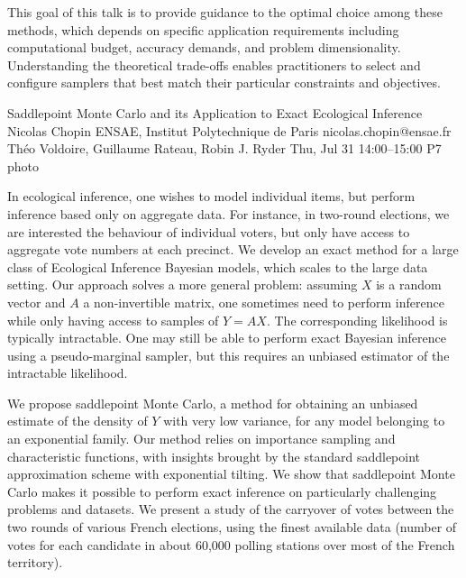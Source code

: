 \begin{talk}
This goal of this talk is to provide
guidance to 
the optimal choice among these methods, which depends on specific application requirements including computational budget, accuracy demands, and problem dimensionality. Understanding the theoretical trade-offs enables practitioners to select and configure samplers that best match their particular constraints and objectives.

\vspace{-10ex}
\end{talk}

\clearpage
\begin{talk}
  {Saddlepoint Monte Carlo and its Application to Exact Ecological Inference}%
  {Nicolas Chopin}%
  {ENSAE, Institut Polytechnique de Paris}%
  {nicolas.chopin@ensae.fr}%
  {Théo Voldoire, Guillaume Rateau, Robin J. Ryder}%
  {}%
  {Thu, Jul 31 14:00–15:00}%
  {P7}%
  {photo}%
  
				
			

In ecological inference, one wishes to model individual items, but perform
inference based only on aggregate data.  For instance, in two-round elections,
we are interested the behaviour of individual voters, but only have access to
aggregate vote numbers at each precinct.  We develop an exact method for a
large class of Ecological Inference Bayesian models, which scales  to the large
data setting.  Our approach solves a more general problem:  assuming $X$ is a
random vector and $A$ a non-invertible matrix, one sometimes need to perform
inference while only having access to samples of $Y=AX$. The corresponding
likelihood is typically intractable. One may still be able to perform exact
Bayesian inference using a pseudo-marginal sampler, but this requires an
unbiased estimator of the intractable likelihood.

We propose saddlepoint Monte Carlo, a method for obtaining an unbiased estimate
of the density of $Y$ with very low variance, for any model belonging to an
exponential family. Our method relies on importance sampling and 
characteristic functions, with insights brought by the standard saddlepoint
approximation scheme with exponential tilting.  We show that saddlepoint Monte
Carlo makes it possible to perform exact inference on particularly challenging
problems and datasets.  We present a study of the carryover of votes between
the two rounds of various French elections, using the finest available data
(number of votes for each candidate in about 60,000 polling stations over most
of the French territory). 


\end{talk}
